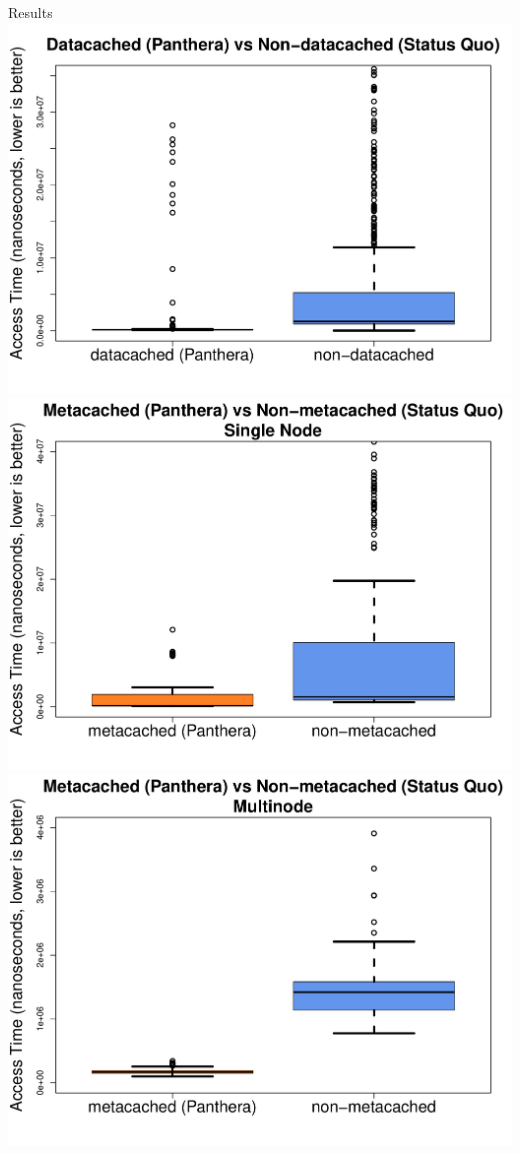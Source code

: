 \documentclass[final]{beamer} %
\begin{document}
\begin{frame}
\begin{columns}[t]
\begin{column}{0.32\textwidth}
	\begin{block}{Results}
		\includegraphics[scale=1.10]{assets/box-plot-data-larger.pdf}
		\vspace{1em}
		\includegraphics[scale=1.1]{assets/box-plot-metadata-larger.pdf}
		\vspace{1em}
		\includegraphics[scale=1.1]{assets/box-plot-meta-multinode-larger.pdf}
	\end{block}


\end{column}
\end{columns}
\end{frame}
\end{document}
